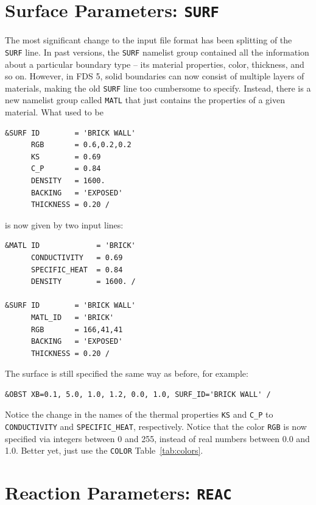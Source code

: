 \documentclass[11pt]{book}
\newcommand{\ct}{\tt\small}
\begin{document}
\section{Surface Parameters: \texorpdfstring{{\tt SURF}}{SURF}}

The most significant change to the input file format has been splitting of the {\ct SURF} line. In past versions, the {\ct SURF}
namelist group contained all the information about a particular boundary type -- its material properties, color, thickness, and so on.
However, in FDS 5, solid boundaries can now consist of multiple layers of materials, making the old {\ct SURF} line too cumbersome to
specify. Instead, there is a new namelist group called {\ct MATL} that just contains the properties of a given material. What used to
be

\footnotesize
\begin{verbatim}
&SURF ID        = 'BRICK WALL'
      RGB       = 0.6,0.2,0.2
      KS        = 0.69
      C_P       = 0.84
      DENSITY   = 1600.
      BACKING   = 'EXPOSED'
      THICKNESS = 0.20 /
\end{verbatim}
\normalsize

\noindent
is now given by two input lines:

\footnotesize
\begin{verbatim}
&MATL ID             = 'BRICK'
      CONDUCTIVITY   = 0.69
      SPECIFIC_HEAT  = 0.84
      DENSITY        = 1600. /

&SURF ID        = 'BRICK WALL'
      MATL_ID   = 'BRICK'
      RGB       = 166,41,41
      BACKING   = 'EXPOSED'
      THICKNESS = 0.20 /
\end{verbatim}
\normalsize

\noindent
The surface is still specified the same way as before, for example:

\footnotesize
\begin{verbatim}
&OBST XB=0.1, 5.0, 1.0, 1.2, 0.0, 1.0, SURF_ID='BRICK WALL' /
\end{verbatim}
\normalsize

\noindent
Notice the change in the names of the thermal properties {\ct KS} and {\ct C\_P} to {\ct CONDUCTIVITY} and
{\ct SPECIFIC\_HEAT}, respectively. Notice that the color {\ct RGB} is now specified via integers between 0 and 255, instead of
real numbers between 0.0 and 1.0. Better yet, just use the {\ct COLOR} Table~\ref{tab:colors}.



\section{Reaction Parameters: \texorpdfstring{{\tt REAC}}{REAC}}
\end{document}
